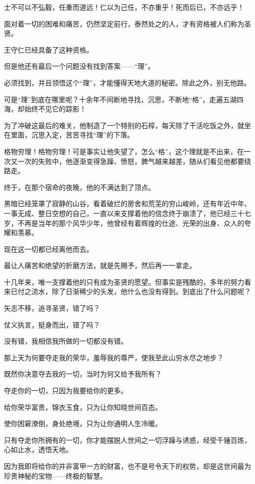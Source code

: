 \begin{multicols}{\theparacolNo}
士不可以不弘毅，任重而道远！仁以为己任，不亦重乎！死而后已，不亦远乎！

面对着一切的困难和痛苦，仍然坚定前行，泰然处之的人，才有资格被人们称为圣贤。

王守仁已经具备了这种资格。

但是他还有最后一个问题没有找到答案——“理”。

必须找到，并且领悟这个“理”，才能懂得天地大道的秘密。除此之外，别无他路。

可是“理”到底在哪里呢？十余年不间断地寻找，沉思，不断地“格”，走遍五湖四海，却始终不见它的踪影！

为了冲破这最后的难关，他制造了一个特别的石椁，每天除了干活吃饭之外，就坐在里面，沉思入定，苦苦寻找“理”的下落。

格物穷理！格物穷理！可是事实让他失望了，怎么“格”，这个理就是不出来，在一次又一次的失败中，他逐渐变得急躁、愤怒，脾气越来越差，随从们看见他都要绕路走。

终于，在那个宿命的夜晚，他的不满达到了顶点。

黑暗已经笼罩了寂静的山谷，看着破烂的房舍和荒芜的穷山峻岭，还有年近中年、一事无成、整日空想的自己，一直以来支撑着他的信念终于崩溃了，他已经三十七岁，不再是当年的那个风华少年，他曾经有着辉煌的仕途、光荣的出身、众人的夸耀和羡慕。

现在这一切都已经离他而去。

最让人痛苦和绝望的折磨方法，就是先赐予，然后再一一拿走。

十几年来，唯一支撑着他的只有成为圣贤的愿望。但事实是残酷的，多年的努力看来已付之流水，除了日渐稀少的头发，他什么也没有得到。到底出了什么问题呢？

矢志不移，追寻圣贤，错了吗？

仗义执言，挺身而出，错了吗？

没有错，我相信我所做的一切都没有错。

那上天为何要夺走我的荣华，羞辱我的尊严，使我至此山穷水尽之地步？

既然你决意夺去我的一切，当时为何又给予我所有？

夺走你的一切，只因为我要给你的更多。

给你荣华富贵，锦衣玉食，只为让你知晓世间百态。

使你困窘潦倒，身处绝境，只为让你通明人生冷暖。

只有夺走你所拥有的一切，你才能摆脱人世间之一切浮躁与诱惑，经受千锤百炼，心如止水，透悟天地。

因为我即将给你的并非富甲一方的财富，也不是号令天下的权势，却是这世间最为珍贵神秘的宝物——终极的智慧。


\end{multicols}

